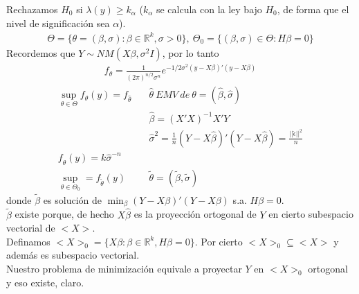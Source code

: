 \documentclass[10pt]{article}
\theoremstyle{plain}
\theoremstyle{definition}
\begin{document}
Rechazamos $H_{0}$ si $\lambda(y) \ge k_{\alpha}$ ($k_{\alpha}$ se calcula con la ley bajo $H_{0}$, de forma que el nivel de significación sea $\alpha$).
\begin{align*}
\Theta = \{\theta = (\beta,\sigma)\colon \beta \in \mathbb{R}^k, \sigma > 0 \},\ \Theta_{0} = \{(\beta,\sigma)\in \Theta \colon H\beta = 0\}
\end{align*}
Recordemos que $Y \sim NM(X\beta, \sigma^2I)$, por lo tanto
\begin{align*}
f_{\theta} = \frac{1}{(2\pi)^{n/2}\sigma^n}e^{-1/2\sigma^2 (y- X\beta)'(y-X\beta)}
\end{align*}
\begin{align*}
\sup_{\theta\in \Theta} f_{\theta}(y) = f_{\hat{\theta}} &\quad \hat{\theta}\ EMV\ de\ \theta= (\hat{\beta},\hat{\sigma})\\
&\quad \hat{\beta} = (X'X)^{-1}X'Y\\
&\quad \hat{\sigma}^2 = \frac{1}{n}(Y-X\hat{\beta})'(Y-X\hat{\beta}) = \frac{||\hat{\epsilon}||^2}{n}\\
f_{\hat{\theta}}(y) = k \hat{\sigma}^{-n}\\
\sup_{\theta\in\Theta_{0}} = f_{\tilde{\theta}}(y) &\quad \tilde{\theta} = (\tilde{\beta},\tilde{\sigma})
\end{align*}
donde $\tilde{\beta}$ es solución de $\min_{\beta} (Y-X\beta)'(Y-X\beta)$ s.a. $H\beta= 0$.\\

$\tilde{\beta}$ existe porque, de hecho $X\hat{\beta}$ es la proyección ortogonal de $Y$ en cierto subespacio vectorial de $<X>$.\\

Definamos $<X>_{0} = \{X\beta \colon \beta \in \mathbb{R}^k, H\beta = 0\}$. Por cierto $<X>_{0}\subseteq <X>$ y además es subespacio vectorial.\\

Nuestro problema de minimización equivale a proyectar $Y$ en $<X>_{0}$ ortogonal y eso existe, claro.\\
\end{document}
